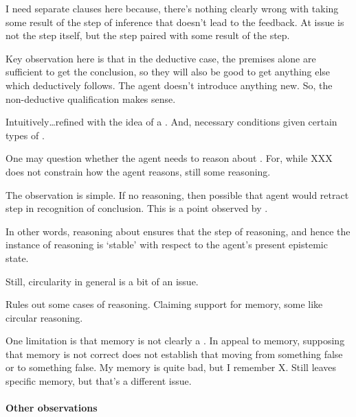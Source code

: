 \begin{note}
  {
    \color{red}
    I need separate clauses here because, there's nothing clearly wrong with taking some result of the step of inference that doesn't lead to the feedback.
    At issue is not the step itself, but the step paired with some result of the step.
  }

  {
    \color{red}
    Key observation here is that in the deductive case, the premises alone are sufficient to get the conclusion, so they will also be good to get anything else which deductively follows.
    The agent doesn't introduce anything new.
    So, the non-deductive qualification makes sense.
  }


  Intuitively\dots refined \ideaCS{} with the idea of a \requ{}.
  And, necessary conditions given certain types of \requ{}.
\end{note}

\begin{note}
  One may question whether the agent needs to reason about .
  For, while {\color{red} XXX} does not constrain how the agent reasons, still some reasoning.

  The observation is simple.
  If no reasoning, then possible that agent would retract step in recognition of conclusion.
  This is a point observed by \citeauthor{Harman:1973ww}.

  In other words, reasoning about \crequ{} ensures that the step of reasoning, and hence the instance of reasoning is `stable' with respect to the agent's present epistemic state.
\end{note}

\hozline

\begin{note}
  Still, circularity in general is a bit of an issue.

  Rules out some cases of reasoning.
  Claiming support for memory, some like circular reasoning.

  One limitation is that memory is not clearly a \requ{}.
  In appeal to memory, supposing that memory is not correct does not establish that moving from something false or to something false.
  My memory is quite bad, but I remember X.
  Still leaves specific memory, but that's a different issue.
\end{note}


\paragraph{Other observations}

